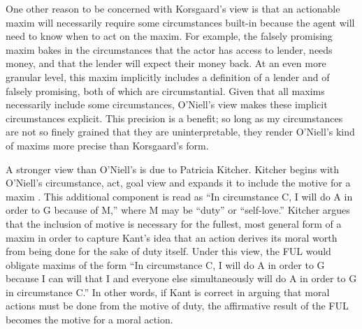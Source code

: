 \begin{isabellebody}
\begin{isamarkuptext}
One other reason to be concerned with Korsgaard's view is that an actionable maxim will necessarily
require some circumstances built-in because the agent will need to know when to act on the maxim. For example,
the falsely promising maxim bakes in the circumstances that the actor has access to lender, needs money, 
and that the lender will expect their money back. At an even more granular level, this maxim implicitly includes
a definition of a lender and of falsely promising, both of which are circumstantial. Given that all
maxims necessarily include some circumstances, O'Niell's view makes these implicit circumstances
explicit. This precision is a benefit; so long as my circumstances are not so finely grained that they
are uninterpretable, they render O'Niell's kind of maxims more precise than Korsgaard's form.%
\end{isamarkuptext}\isamarkuptrue%
%
\isadelimdocument
%
\endisadelimdocument
%
\isatagdocument
%
\isamarkuptrue%
%
\endisatagdocument
{\isafolddocument}%
%
\isadelimdocument
%
\endisadelimdocument
%
\begin{isamarkuptext}%
A stronger view than O'Niell's is due to Patricia Kitcher. Kitcher begins with O'Niell's 
circumstance, act, goal view and expands it to include the motive for a maxim \citep{whatisamaxim}. 
This additional component is read as ``In circumstance C, I will do A in order to G because of M,'' 
where M may be ``duty'' or ``self-love.'' Kitcher argues that the inclusion of motive is necessary 
for the fullest, most general form of a maxim in order to capture Kant's idea that an action derives 
its moral worth from being done for the sake of duty itself. Under this view, the FUL would obligate maxims of the form 
``In circumstance C, I will do A in order to G because I can will that I and everyone else simultaneously
will do A in order to G in circumstance C.'' In other words, if Kant is correct in arguing that moral 
actions must be done from the motive of duty, the affirmative result of the FUL becomes 
the motive for a moral action.


\end{isamarkuptext}
\end{isabellebody}
